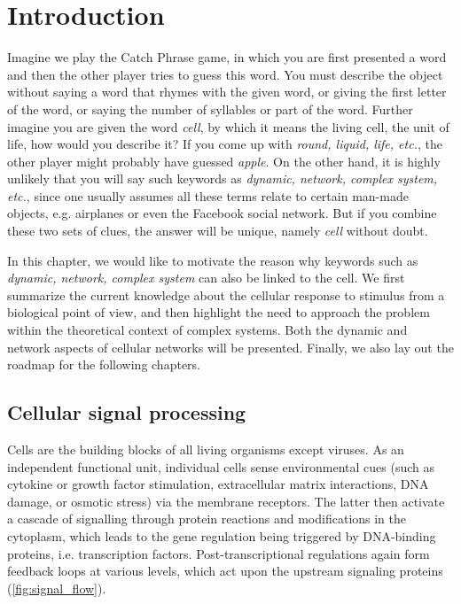 \chapter{Introduction}
Imagine we play the Catch Phrase game, in which you are
first presented a word and then the other player tries 
to guess this
word. You must describe the object without saying a word that rhymes with the given word, or giving the first letter of the word, or saying the number of syllables or part of the word.
Further imagine you are given the word \emph{cell}, 
by which it means the living cell, the unit of life,
how 
would you describe it? If you come up with \emph{round,
liquid, life, etc.}, the other player might probably have guessed 
\emph{apple}. On the other hand, it is highly unlikely that 
you will say such keywords as
\emph{dynamic, network, complex system, etc.}, since one 
usually assumes all these terms relate to certain man-made 
objects, e.g. airplanes or even the Facebook social network. 
But if you combine these two sets of clues, 
the answer will be unique, namely \emph{cell} without doubt.

In this chapter, we would like to motivate the reason 
why keywords such
as \emph{dynamic, network, complex system} can also be linked
to the cell.
We first summarize the current knowledge about
the cellular response to stimulus from a biological point of
view, and then highlight the need to approach the problem
within the theoretical context of complex systems. 
Both the dynamic and 
network aspects of cellular networks will be presented. 
Finally, we also lay out the roadmap for the following 
chapters.

\section{Cellular signal processing}
Cells are the building blocks of all living organisms except viruses. As an 
independent functional unit, individual cells sense environmental cues 
(such as cytokine or growth factor stimulation, extracellular matrix interactions, DNA damage, or osmotic stress) via the membrane receptors. The latter
then activate a cascade of signalling through protein reactions and modifications in the cytoplasm,
which leads to the gene regulation being triggered by 
DNA-binding proteins, i.e. transcription factors. Post-transcriptional
regulations again form feedback loops at various levels, which act upon the
upstream signaling proteins (\ref{fig:signal_flow}).

